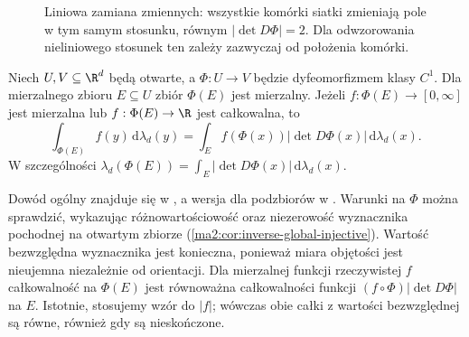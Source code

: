 \begin{figure}[htbp]
\centering
{}
\caption{Liniowa zamiana zmiennych:
wszystkie komórki siatki zmieniają pole
w tym samym stosunku, równym
$|\det D\Phi|=2$. Dla odwzorowania
nieliniowego stosunek ten zależy
zazwyczaj od położenia komórki.}
\label{ma2:fig:multiple-jacobian-linear}
\end{figure}

\begin{twierdzenie}
\label{ma2:thm:multiple-change}
Niech $U,V\subseteq\R^d$ będą otwarte, a
$\Phi:U\to V$ będzie dyfeomorfizmem klasy $C^1$.
Dla mierzalnego zbioru $E\subseteq U$ zbiór
$\Phi(E)$ jest mierzalny. Jeżeli
$f:\Phi(E)\to[0,\infty]$ jest mierzalna lub
$f:\Phi(E)\to\R$ jest całkowalna, to
\[
 \int_{\Phi(E)} f(y)\,\mathrm d\lambda_d(y)
 =\int_E f(\Phi(x))|\det D\Phi(x)|\,
 \mathrm d\lambda_d(x).
\]
W szczególności
$\lambda_d(\Phi(E))=\int_E|\det D\Phi(x)|
\,\mathrm d\lambda_d(x)$.
\end{twierdzenie}
Dowód ogólny znajduje się w
,
a wersja dla podzbiorów w
.
Warunki na $\Phi$ można sprawdzić, wykazując
różnowartościowość oraz niezerowość wyznacznika
pochodnej na otwartym zbiorze
(\ref{ma2:cor:inverse-global-injective}).
Wartość bezwzględna wyznacznika jest konieczna,
ponieważ miara objętości jest nieujemna
niezależnie od orientacji.
Dla mierzalnej funkcji rzeczywistej $f$
całkowalność na $\Phi(E)$ jest równoważna
całkowalności funkcji
$(f\circ\Phi)|\det D\Phi|$ na $E$.
Istotnie, stosujemy wzór do $|f|$; wówczas
obie całki z wartości bezwzględnej są równe,
również gdy są nieskończone.

